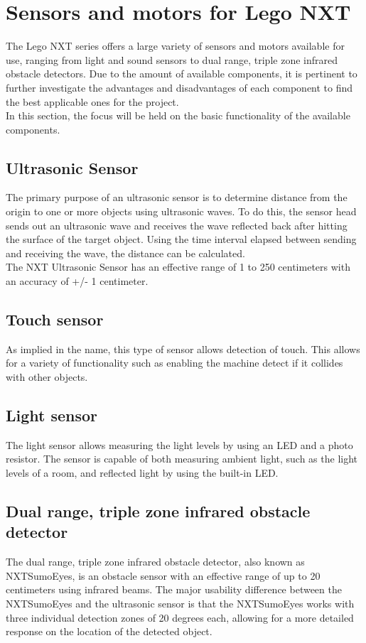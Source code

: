 \section{Sensors and motors for Lego NXT}
The Lego NXT series offers a large variety of sensors and motors available for use, ranging from light and sound sensors to dual range, triple zone infrared obstacle detectors.
Due to the amount of available components, it is pertinent to further investigate the advantages and disadvantages of each component to find the best applicable ones for the project.\\
In this section, the focus will be held on the basic functionality of the available components.

\subsection{Ultrasonic Sensor}
The primary purpose of an ultrasonic sensor is to determine distance from the origin to one or more objects using ultrasonic waves.
To do this, the sensor head sends out an ultrasonic wave and receives the wave reflected back after hitting the surface of the target object.
Using the time interval elapsed between sending and receiving the wave, the distance can be calculated.\\
The NXT Ultrasonic Sensor has an effective range of 1 to 250 centimeters with an accuracy of +/- 1 centimeter.

\subsection{Touch sensor}
As implied in the name, this type of sensor allows detection of touch.
This allows for a variety of functionality such as enabling the machine detect if it collides with other objects.

\subsection{Light sensor}
The light sensor allows measuring the light levels by using an LED and a photo resistor.
The sensor is capable of both measuring ambient light, such as the light levels of a room, and reflected light by using the built-in LED.

\subsection{Dual range, triple zone infrared obstacle detector}
The dual range, triple zone infrared obstacle detector, also known as NXTSumoEyes, is an obstacle sensor with an effective range of up to 20 centimeters using infrared beams.
The major usability difference between the NXTSumoEyes and the ultrasonic sensor is that the NXTSumoEyes works with three individual detection zones of 20 degrees each, allowing for a more detailed response on the location of the detected object.

